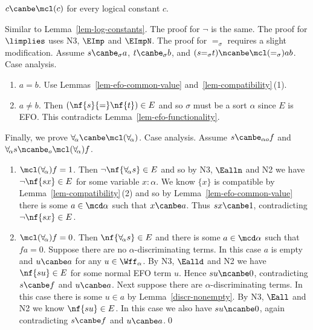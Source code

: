 \begin{lem}
  \label{lem-efo-log-constants}
  $c\canbe\mcl(c)$ for every logical constant $c$. \end{lem}
\proof Similar to Lemma~\ref{lem-log-constants}.  The proof for $\neg$ is the same.
  The proof for $\limplies$ uses N3, $\EImp$ and $\EImpN$.
  The proof for $=_\sigma$ requires a slight modification.
  Assume $s\canbe_\sigma a$,
  $t\canbe_\sigma b$, and
  $(s{=_\sigma}t)\ncanbe\mcl(=_\sigma)ab$.  Case analysis.
  \begin{enumerate}[$\bullet$]
  \item $a=b$.  Use Lemmas~\ref{lem-efo-common-value} and~\ref{lem-compatibility}\,(1).
  \item $a\neq b$. Then $(\nf{s}{=}\nf{t})\in E$ and so $\sigma$ must be a sort $\alpha$ since $E$ is EFO.
    This contradicts Lemma~\ref{lem-efo-functionality}.
  \end{enumerate}
  Finally, we prove $\forall_{\!\alpha}\canbe\mcl(\forall_{\!\alpha})$.  Case analysis.  Assume $s\canbe_{\alpha o} f$ and $\forall_{\!\alpha} s\ncanbe_o \mcl(\forall_{\!\alpha}) f$.
  \begin{enumerate}[$\bullet$]
  \item $\mcl(\forall_{\!\alpha}) f=1$.  Then $\neg\nf{\forall_{\!\alpha} s} \in E$ and so 
    by N3, $\Ealln$ and N2 we have $\neg\nf{sx}\in E$ for some variable $x:\alpha$.
    We know $\{x\}$ is compatible by Lemma~\ref{lem-compatibility}\,(2) and so by Lemma~\ref{lem-efo-common-value} there is some $a\in\mcd\alpha$ such that $x\canbe a$.
    Thus $sx\canbe 1$, contradicting $\neg\nf{sx}\in E$.
  \item $\mcl(\forall_{\!\alpha}) f=0$.  Then $\nf{\forall_{\!\alpha} s}\in E$ and 
    there is some $a\in\mcd\alpha$ such that $fa = 0$.
    Suppose there are no $\alpha$-discriminating terms.
    In this case $a$ is empty and $u\canbe a$ for any $u\in\Wff_\alpha$.
    By N3, $\Ealld$ and N2 we have $\nf{su}\in E$ for some normal EFO term $u$.
    Hence $su\ncanbe 0$, contradicting $s\canbe f$ and $u\canbe a$.
    Next suppose there are $\alpha$-discriminating terms.
    In this case there is some $u\in a$ by Lemma~\ref{discr-nonempty}.  
    By N3, $\Eall$ and N2 we know $\nf{su}\in E$.
    In this case we also have $su\ncanbe 0$, again contradicting $s\canbe f$ and $u\canbe a$.\qed
  \end{enumerate}

